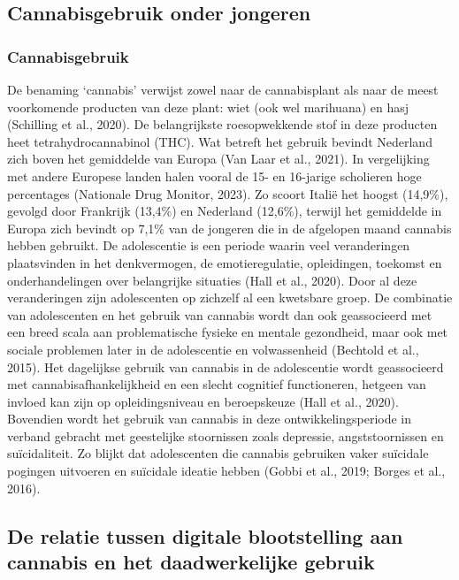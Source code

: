 \documentclass[
  letterpaper,
  DIV=11,
  numbers=noendperiod]{scrartcl}
\begin{document}
\hypertarget{cannabisgebruik-onder-jongeren}{%
\subsection{Cannabisgebruik onder
jongeren}\label{cannabisgebruik-onder-jongeren}}

\hypertarget{cannabisgebruik}{%
\subsubsection{Cannabisgebruik}\label{cannabisgebruik}}

De benaming `cannabis' verwijst zowel naar de cannabisplant als naar de
meest voorkomende producten van deze plant: wiet (ook wel marihuana) en
hasj (Schilling et al., 2020). De belangrijkste roesopwekkende stof in
deze producten heet tetrahydrocannabinol (THC). Wat betreft het gebruik
bevindt Nederland zich boven het gemiddelde van Europa (Van Laar et al.,
2021). In vergelijking met andere Europese landen halen vooral de 15- en
16-jarige scholieren hoge percentages (Nationale Drug Monitor, 2023). Zo
scoort Italië het hoogst (14,9\%), gevolgd door Frankrijk (13,4\%) en
Nederland (12,6\%), terwijl het gemiddelde in Europa zich bevindt op
7,1\% van de jongeren die in de afgelopen maand cannabis hebben
gebruikt. De adolescentie is een periode waarin veel veranderingen
plaatsvinden in het denkvermogen, de emotieregulatie, opleidingen,
toekomst en onderhandelingen over belangrijke situaties (Hall et al.,
2020). Door al deze veranderingen zijn adolescenten op zichzelf al een
kwetsbare groep. De combinatie van adolescenten en het gebruik van
cannabis wordt dan ook geassocieerd met een breed scala aan
problematische fysieke en mentale gezondheid, maar ook met sociale
problemen later in de adolescentie en volwassenheid (Bechtold et al.,
2015). Het dagelijkse gebruik van cannabis in de adolescentie wordt
geassocieerd met cannabisafhankelijkheid en een slecht cognitief
functioneren, hetgeen van invloed kan zijn op opleidingsniveau en
beroepskeuze (Hall et al., 2020). Bovendien wordt het gebruik van
cannabis in deze ontwikkelingsperiode in verband gebracht met
geestelijke stoornissen zoals depressie, angststoornissen en
suïcidaliteit. Zo blijkt dat adolescenten die cannabis gebruiken vaker
suïcidale pogingen uitvoeren en suïcidale ideatie hebben (Gobbi et al.,
2019; Borges et al., 2016).

\hypertarget{de-relatie-tussen-digitale-blootstelling-aan-cannabis-en-het-daadwerkelijke-gebruik}{%
\subsection{De relatie tussen digitale blootstelling aan cannabis en het
daadwerkelijke
gebruik}\label{de-relatie-tussen-digitale-blootstelling-aan-cannabis-en-het-daadwerkelijke-gebruik}}
\end{document}
